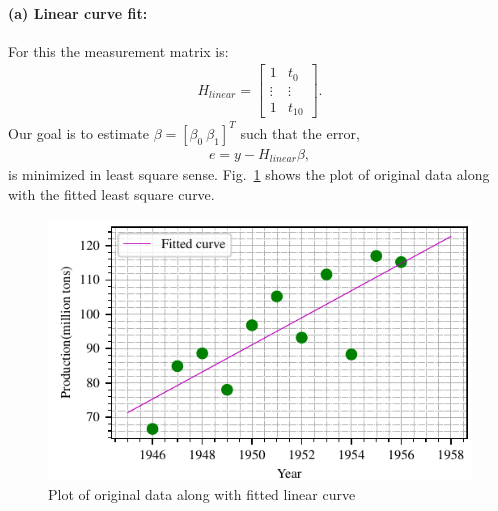 \paragraph{(a) Linear curve fit:}For this the measurement matrix is:
\begin{align*}
	H_{linear} = \begin{bmatrix}1 & t_0\\ \vdots & \vdots\\1 & t_{10}\end{bmatrix}.
\end{align*}
Our goal is to estimate $\beta = [\beta_0\ \beta_1]^T$ such that the error,
\begin{align*}
	e = y - H_{linear}\beta,
\end{align*}
is minimized in least square sense. Fig.~\ref{fig:fit_linear} shows the plot of original data along with the fitted least square curve.
\begin{figure}[h]
	\centering
	\includegraphics[scale=1.0,trim={0cm 0cm 0cm 0cm},clip]{./code/generatedPlots/fit_linear.pdf}
	\caption{Plot of original data along with fitted linear curve}
	\label{fig:fit_linear}
\end{figure}

